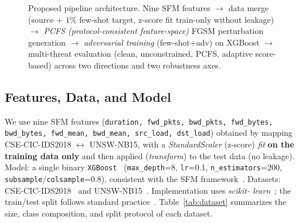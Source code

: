 \documentclass[preprint,12pt,authoryear]{elsarticle}
\begin{document}
\begin{figure}[h]
\centering
\resizebox{0.95\linewidth}{!}{}
\caption{Proposed pipeline architecture. Nine SFM features $\rightarrow$ data merge
(source $+$ $1\%$ few-shot target, z-score fit train-only without leakage)
$\rightarrow$ \emph{PCFS (protocol-consistent feature-space)} FGSM perturbation
generation $\rightarrow$ \emph{adversarial training} (few-shot$+$adv) on XGBoost
$\rightarrow$ multi-threat evaluation (clean, unconstrained, PCFS,
adaptive score-based) across two directions and two robustness axes.}
\label{fig:pipeline}
\end{figure}

\subsection{Features, Data, and Model}
We use nine SFM features (\texttt{duration, fwd\_pkts, bwd\_pkts, fwd\_bytes,
bwd\_bytes, fwd\_mean, bwd\_mean, src\_load, dst\_load}) obtained by mapping
CSE-CIC-IDS2018 $\leftrightarrow$ UNSW-NB15, with a \emph{StandardScaler} (z-score)
\emph{fit} \textbf{on the training data only} and then applied (\emph{transform})
to the test data (no leakage). Model: a single binary \texttt{XGBoost}~\citep{xgboost}
(\texttt{max\_depth}=8, \texttt{lr}=0.1, \texttt{n\_estimators}=200,
\texttt{subsample}/\texttt{colsample}=0.8), consistent with the SFM
framework~\citep{martono2024sfm}. Datasets: CSE-CIC-IDS2018~\citep{sharafaldin2018}
and UNSW-NB15~\citep{moustafa2015}. Implementation uses \emph{scikit-
learn}~\citep{sklearn}; the train/test split follows standard
practice~\citep{kohavi}. Table~\ref{tab:dataset} summarizes the size, class
composition, and split protocol of each dataset.
\end{document}
